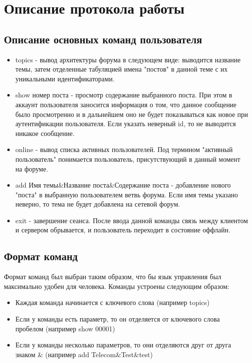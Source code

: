 \documentclass[10pt,a4paper]{report}
\begin{document}
\chapter{Описание протокола работы}
\section{Описание основных команд пользователя}
\begin{itemize}
\item topics - вывод архитектуры форума в следующем виде: выводится название темы, затем отделенные табуляцией имена "постов" в данной теме с их уникальными идентификаторами.
\item show номер поста - просмотр содержание выбранного поста. При этом в аккаунт пользователя заносится информация о том, что данное сообщение было просмотренно и в дальнейшем оно не будет показываться как новое при аутентификации пользователя. Если указать неверный id, то не выводится никакое сообщение.
\item online - вывод списка активных пользователей. Под термином "активный пользователь" понимается пользователь, присутствующий в данный момент на форуме.
\item add Имя темы\&Название поста\&Содержание поста - добавление нового "поста" в выбранную пользователем ветвь форума. Если имя темы указано неверно, то тема не будет добавлена на сетевой форум.
\item exit - завершение сеанса. После ввода данной команды связь между клиентом и сервером обрывается, и пользователь переходит в состояние оффлайн.
\end{itemize}
\section{Формат команд}
Формат команд был выбран таким образом, что бы язык управления был максимально удобен для человека. Команды устроены следующим образом:
\begin{itemize}
\item Каждая команда начинается с ключевого слова (например topics)
\item Если у команды есть параметр, то он отделяется от ключевого слова пробелом (например show 00001)
\item Если у команды несколько параметров, то они отделяются друг от друга знаком \& (например add Telecom\&Test\&test)
\end{itemize}
\end{document}
